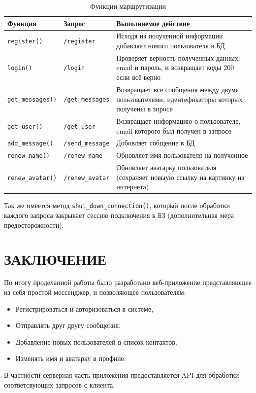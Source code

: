 \documentclass[14pt,final]{report}
\begin{document}
\begin{table}[h]
    \centering
    \begin{tabular}{|p{3cm}|p{3cm}|p{10cm}|}
        \hline
        Функция & Запрос & Выполняемое действие \\ \hline
        \texttt{register()} & \texttt{/register} & Исходя из полученной информации добавляет нового пользователя в БД \\ \hline
        \texttt{login()} & \texttt{/login} & Проверяет верность полученных данных: email и пароль, и возвращает коды 200 если всё верно  \\ \hline
        \texttt{get_messages()} & \texttt{/get_messages} & Возвращает все сообщения между двумя пользователями, идентефикаторы которых получены в зпросе \\ \hline
        \texttt{get_user()} & \texttt{/get_user} & Возвращает информацию о пользователе, email которого был получен в запросе \\ \hline
        \texttt{add_message()} & \texttt{/send_message} & Добовляет собщение в БД \\ \hline
        \texttt{renew_name()} & \texttt{/renew_name} & Обновляет имя пользователя на полученное \\ \hline
        \texttt{renew_avatar()} & \texttt{/renew_avatar} & Обновляет аватарку пользователя (сохраняет новыую ссылку на картинку из интернета) \\ \hline
    \end{tabular}
    \caption{Функции маршрутизации}
    \label{tab1}
\end{table}

Так же имеется метод \texttt{shut_down_connection()}, который после обработки каждого запроса закрывает сессию подключения к БЗ (дополнительная мера предосторожности).

\chapter*{ЗАКЛЮЧЕНИЕ}
По итогу проделанной работы было разработано веб-приложение представляющее из себя простой мессенджер, и позволяющее пользователям:
\begin{itemize}
    \item Регистрироваться и авторизоваться в системе,
    \item Отправлять друг другу сообщения,
    \item Добавление новых пользователей в список контактов,
    \item Изменять имя и аватарку в профиле.
\end{itemize}
В частности серверная часть приложения предоставляется API для обработки соответсвующих запросов с клиента.
\end{document}
